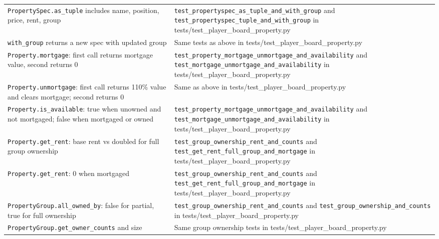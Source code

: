 \documentclass[11pt]{article}
\begin{document}
\begin{longtable}{>{\raggedright\arraybackslash}p{} >{\raggedright\arraybackslash}p{}}
\multicolumn{2}{l}{\textbf{moneypoly.property: Property, PropertySpec, PropertyGroup}} \\ \hline
\texttt{PropertySpec.as\_tuple} includes name, position, price, rent, group & \texttt{test\_propertyspec\_as\_tuple\_and\_with\_group} and \texttt{test\_propertyspec\_tuple\_and\_with\_group} in tests/test\_player\_board\_property.py \\ \hline
\texttt{with\_group} returns a new spec with updated group & Same tests as above in tests/test\_player\_board\_property.py \\ \hline
\texttt{Property.mortgage}: first call returns mortgage value, second returns 0 & \texttt{test\_property\_mortgage\_unmortgage\_and\_availability} and \texttt{test\_mortgage\_unmortgage\_and\_availability} in tests/test\_player\_board\_property.py \\ \hline
\texttt{Property.unmortgage}: first call returns 110\% value and clears mortgage; second returns 0 & Same as above in tests/test\_player\_board\_property.py \\ \hline
\texttt{Property.is\_available}: true when unowned and not mortgaged; false when mortgaged or owned & \texttt{test\_property\_mortgage\_unmortgage\_and\_availability} and \texttt{test\_mortgage\_unmortgage\_and\_availability} in tests/test\_player\_board\_property.py \\ \hline
\texttt{Property.get\_rent}: base rent vs doubled for full group ownership & \texttt{test\_group\_ownership\_rent\_and\_counts} and \texttt{test\_get\_rent\_full\_group\_and\_mortgage} in tests/test\_player\_board\_property.py \\ \hline
\texttt{Property.get\_rent}: 0 when mortgaged & \texttt{test\_group\_ownership\_rent\_and\_counts} and \texttt{test\_get\_rent\_full\_group\_and\_mortgage} in tests/test\_player\_board\_property.py \\ \hline
\texttt{PropertyGroup.all\_owned\_by}: false for partial, true for full ownership & \texttt{test\_group\_ownership\_rent\_and\_counts} and \texttt{test\_group\_ownership\_and\_counts} in tests/test\_player\_board\_property.py \\ \hline
\texttt{PropertyGroup.get\_owner\_counts} and size & Same group ownership tests in tests/test\_player\_board\_property.py \\ \hline


\end{longtable}
\end{document}
